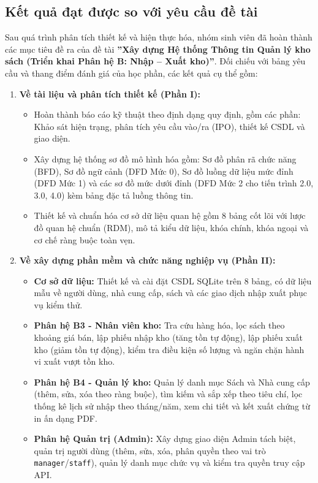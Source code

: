 \documentclass[12pt,a4paper]{article}
\begin{document}
\subsection{Kết quả đạt được so với yêu cầu đề tài}
\label{subsec:ket-qua-dat-duoc}

Sau quá trình phân tích thiết kế và hiện thực hóa, nhóm sinh viên đã hoàn thành các mục tiêu đề ra của đề tài \textbf{''Xây dựng Hệ thống Thông tin Quản lý kho sách (Triển khai Phân hệ B: Nhập – Xuất kho)''}. Đối chiếu với bảng yêu cầu và thang điểm đánh giá của học phần, các kết quả cụ thể gồm:
\begin{enumerate}
    \item \textbf{Về tài liệu và phân tích thiết kế (Phần I):}
    \begin{itemize}
        \item Hoàn thành báo cáo kỹ thuật theo định dạng quy định, gồm các phần: Khảo sát hiện trạng, phân tích yêu cầu vào/ra (IPO), thiết kế CSDL và giao diện.
        \item Xây dựng hệ thống sơ đồ mô hình hóa gồm: Sơ đồ phân rã chức năng (BFD), Sơ đồ ngữ cảnh (DFD Mức 0), Sơ đồ luồng dữ liệu mức đỉnh (DFD Mức 1) và các sơ đồ mức dưới đỉnh (DFD Mức 2 cho tiến trình 2.0, 3.0, 4.0) kèm bảng đặc tả luồng thông tin.
        \item Thiết kế và chuẩn hóa cơ sở dữ liệu quan hệ gồm 8 bảng cốt lõi với lược đồ quan hệ chuẩn (RDM), mô tả kiểu dữ liệu, khóa chính, khóa ngoại và cơ chế ràng buộc toàn vẹn.
    \end{itemize}
    \item \textbf{Về xây dựng phần mềm và chức năng nghiệp vụ (Phần II):}
    \begin{itemize}
        \item \textbf{Cơ sở dữ liệu:} Thiết kế và cài đặt CSDL SQLite trên 8 bảng, có dữ liệu mẫu về người dùng, nhà cung cấp, sách và các giao dịch nhập xuất phục vụ kiểm thử.
        \item \textbf{Phân hệ B3 - Nhân viên kho:} Tra cứu hàng hóa, lọc sách theo khoảng giá bán, lập phiếu nhập kho (tăng tồn tự động), lập phiếu xuất kho (giảm tồn tự động), kiểm tra điều kiện số lượng và ngăn chặn hành vi xuất vượt tồn kho.
        \item \textbf{Phân hệ B4 - Quản lý kho:} Quản lý danh mục Sách và Nhà cung cấp (thêm, sửa, xóa theo ràng buộc), tìm kiếm và sắp xếp theo tiêu chí, lọc thống kê lịch sử nhập theo tháng/năm, xem chi tiết và kết xuất chứng từ in ấn dạng PDF.
        \item \textbf{Phân hệ Quản trị (Admin):} Xây dựng giao diện Admin tách biệt, quản trị người dùng (thêm, sửa, xóa, phân quyền theo vai trò \texttt{manager}/\texttt{staff}), quản lý danh mục chức vụ và kiểm tra quyền truy cập API.
    \end{itemize}
\end{enumerate}
\end{document}
